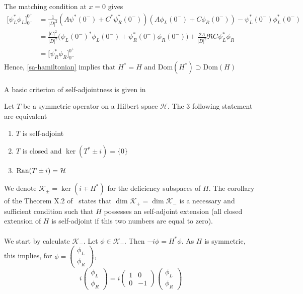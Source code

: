 The matching condition at $x = 0$ gives
\begin{equation*}
\begin{split}
\big[ \psi^*_L\phi_L] ^{0^+}_{0^-} & = \frac{1}{|D|^2}(A \psi^*(0^-) + C^*\psi^*_R(0^-))(A \phi_L(0^-) + C\phi_R(0^-)) - \psi^*_L(0^-)\phi^*_L(0^-) \\
& = \frac{|C|^2}{|D|^2}\big(\psi_L(0^-)^*\phi_L(0^-) + \psi_R^*(0^-) \phi_R(0^-)\big) +
\frac{2A}{|D|^2}\Re{C\psi_L^* \phi_R} \\
& = \big[ \psi^*_R\phi_R] ^{0^+}_{0^-}
\end{split}
\end{equation*}
Hence, \cref{sa-hamiltonian} implies that $H^* = H$ and $\mathrm{Dom}(H^*) \supset \mathrm{Dom}(H)$ 
\\\\
A basic criterion of self-adjointness is given in~\cite{Reed1981}
\begin{theorem}
Let $T$ be a symmetric operator on a Hilbert space $ \mathcal{H}$. The 3 following statement are equivalent 
\begin{enumerate}
\item $T$ is self-adjoint
\item $T$ is closed and $\ker(T^* \pm i) = \{0\}$
\item $\mathrm{Ran}(T \pm i ) = \mathcal{H}$
\end{enumerate} 
\end{theorem}
We denote  $\mathcal{K}_{\pm} = \ker (i \mp H^*)$ for the deficiency subspaces of $H$. The corollary of the Theorem X.2 of~\cite{Reed1975} states that $\dim \mathcal{K}_+ = \dim \mathcal{K}_-$ is a necessary and sufficient condition such that $H$ possesses an self-adjoint extension (all closed extension of $H$ is self-adjoint if this two numbers are equal to zero). \\\\
We start by calculate $\mathcal{K}_-$. Let $\phi \in \mathcal{K}_-$. Then $- i \phi = H^* \phi$. As $H$ is symmetric, this implies, for $\phi = \begin{pmatrix} \phi_L \\  \phi_R \end{pmatrix}$, 
\begin{equation}
i \begin{pmatrix} \phi_L \\ \phi_R \end{pmatrix} = 
i \begin{pmatrix} 1 & 0  \\ 0  &  -1 \end{pmatrix} 
\begin{pmatrix}  \phi_L  \\  \phi_R \end{pmatrix}
\end{equation} 
